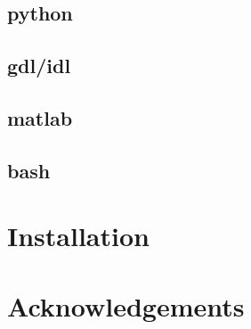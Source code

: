\documentclass[11pt]{article}
\newcommand*\FancyVerbStartString{}
\newcommand*\FancyVerbStopString{}
\newcommand{\codepyt}[4]{%
  \refstepcounter{Listing}%
  \fvset{label=Listing~\theListing#4}%
  \fvset{gobble=#3}%
  \renewcommand*\FancyVerbStartString{\PY{c}{\PYZsh{}\PYZlt{}listing\PYZhy{}#2\PYZgt{}}}%
  \renewcommand*\FancyVerbStopString{\PY{c}{\PYZsh{}\PYZlt{}/listing\PYZhy{}#2\PYZgt{}}}%
  \vspace{-1.5em}%
}
\begin{document}
\subsection{python}
\subsection{gdl/idl}
\subsection{matlab}
\subsection{bash}
 
  
\appendix

\section{Installation}\label{sec:install}

\section*{Acknowledgements}
\footnotesize

\renewcommand*{\bibfont}{\footnotesize}
\printbibliography
\end{document}
